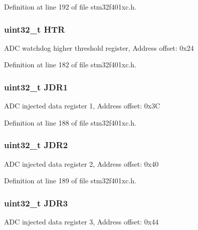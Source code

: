 Definition at line 192 of file stm32f401xc.\+h.

\subsubsection[{\texorpdfstring{H\+TR}{HTR}}]{ uint32\+\_\+t H\+TR}\hypertarget{struct_a_d_c___type_def_a24c3512abcc90ef75cf3e9145e5dbe9b}{}\label{struct_a_d_c___type_def_a24c3512abcc90ef75cf3e9145e5dbe9b}
A\+DC watchdog higher threshold register, Address offset\+: 0x24 

Definition at line 182 of file stm32f401xc.\+h.

\subsubsection[{\texorpdfstring{J\+D\+R1}{JDR1}}]{ uint32\+\_\+t J\+D\+R1}\hypertarget{struct_a_d_c___type_def_a22fa21352be442bd02f9c26a1013d598}{}\label{struct_a_d_c___type_def_a22fa21352be442bd02f9c26a1013d598}
A\+DC injected data register 1, Address offset\+: 0x3C 

Definition at line 188 of file stm32f401xc.\+h.

\subsubsection[{\texorpdfstring{J\+D\+R2}{JDR2}}]{ uint32\+\_\+t J\+D\+R2}\hypertarget{struct_a_d_c___type_def_ae9156af81694b7a85923348be45a2167}{}\label{struct_a_d_c___type_def_ae9156af81694b7a85923348be45a2167}
A\+DC injected data register 2, Address offset\+: 0x40 

Definition at line 189 of file stm32f401xc.\+h.

\subsubsection[{\texorpdfstring{J\+D\+R3}{JDR3}}]{ uint32\+\_\+t J\+D\+R3}\hypertarget{struct_a_d_c___type_def_a3a54028253a75a470fccf841178cba46}{}\label{struct_a_d_c___type_def_a3a54028253a75a470fccf841178cba46}
A\+DC injected data register 3, Address offset\+: 0x44 

